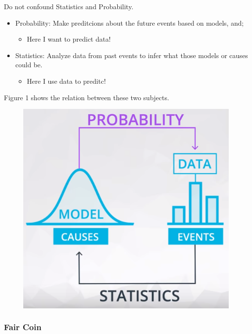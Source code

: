 \documentclass[]{book}
\providecommand{\tightlist}{%
  \setlength{\itemsep}{0pt}\setlength{\parskip}{0pt}}
\begin{document}
Do not confound Statistics and Probability.

\begin{itemize}
\tightlist
\item
  Probability: Make preditcions about the future events based on models,
  and;

  \begin{itemize}
  \tightlist
  \item
    Here I want to predict data!
  \end{itemize}
\item
  Statistics: Analyze data from past events to infer what those models
  or causes could be.

  \begin{itemize}
  \tightlist
  \item
    Here I use data to preditc!
  \end{itemize}
\end{itemize}

Figure 1 shows the relation between these two subjects.

\begin{figure}
\centering
\includegraphics{01-img/c4_l4_01.png}
\caption{}
\end{figure}

\subsubsection{Fair Coin}\label{fair-coin}
\end{document}
